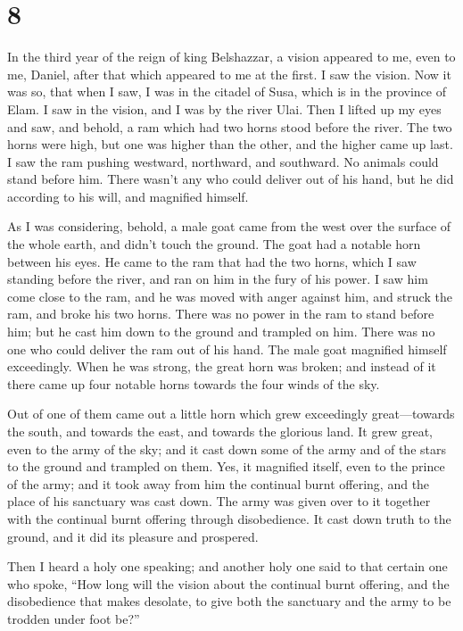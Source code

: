 \hypertarget{section-7}{%
\section{8}\label{section-7}}

 In the third year of the reign of king Belshazzar, a vision
appeared to me, even to me, Daniel, after that which appeared to me at
the first.  I saw the vision. Now it was so, that when I
saw, I was in the citadel of Susa, which is in the province of Elam. I
saw in the vision, and I was by the river Ulai.  Then I
lifted up my eyes and saw, and behold, a ram which had two horns stood
before the river. The two horns were high, but one was higher than the
other, and the higher came up last.  I saw the ram pushing
westward, northward, and southward. No animals could stand before him.
There wasn't any who could deliver out of his hand, but he did according
to his will, and magnified himself.

 As I was considering, behold, a male goat came from the
west over the surface of the whole earth, and didn't touch the ground.
The goat had a notable horn between his eyes.  He came to
the ram that had the two horns, which I saw standing before the river,
and ran on him in the fury of his power.  I saw him come
close to the ram, and he was moved with anger against him, and struck
the ram, and broke his two horns. There was no power in the ram to stand
before him; but he cast him down to the ground and trampled on him.
There was no one who could deliver the ram out of his hand. 
The male goat magnified himself exceedingly. When he was strong, the
great horn was broken; and instead of it there came up four notable
horns towards the four winds of the sky.

 Out of one of them came out a little horn which grew
exceedingly great---towards the south, and towards the east, and towards
the glorious land.  It grew great, even to the army of the
sky; and it cast down some of the army and of the stars to the ground
and trampled on them.  Yes, it magnified itself, even to
the prince of the army; and it took away from him the continual burnt
offering, and the place of his sanctuary was cast down. 
The army was given over to it together with the continual burnt offering
through disobedience. It cast down truth to the ground, and it did its
pleasure and prospered.

 Then I heard a holy one speaking; and another holy one
said to that certain one who spoke, ``How long will the vision about the
continual burnt offering, and the disobedience that makes desolate, to
give both the sanctuary and the army to be trodden under foot be?''

